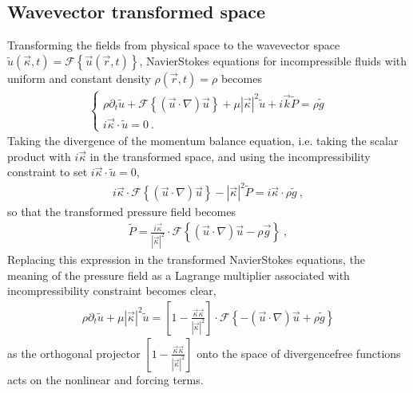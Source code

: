 \documentclass[letterpaper,10pt,english]{jupyterBook}
\begin{document}
\subsection{Wave\sphinxhyphen{}vector transformed space}
\label{\detokenize{ch/pde/ns:wave-vector-transformed-space}}
\sphinxAtStartPar
Transforming the fields from physical space to the wave\sphinxhyphen{}vector space \(\widetilde{u}(\vec{\kappa}, t) = \mathscr{F}\left\{ \vec{u}(\vec{r},t) \right\}\), Navier\sphinxhyphen{}Stokes equations for incompressible fluids with uniform and constant density \(\rho(\vec{r},t) = \rho\) becomes
\begin{equation*}
\begin{split}\begin{cases}
  \rho \partial_t \widetilde{u} + \mathscr{F}\left\{ \left( \vec{u} \cdot \nabla \right) \vec{u} \right\} + \mu |\vec{\kappa}|^2 \widetilde{u} + i \vec{k} \widetilde{P} = \rho \widetilde{g} \\
  i \vec{\kappa} \cdot \widetilde{u} = 0 \ .
\end{cases}\end{split}
\end{equation*}
\sphinxAtStartPar
Taking the divergence of the momentum balance equation, i.e. taking the scalar product with \(i \vec{\kappa}\) in the transformed space, and using the incompressibility constraint to set \(i \vec{\kappa} \cdot \widetilde{u} = 0\),
\begin{equation*}
\begin{split}i \vec{\kappa} \cdot \mathscr{F}\left\{ (\vec{u} \cdot \nabla ) \vec{u} \right\} - |\vec{\kappa}|^2 \widetilde{P} = i \vec{\kappa} \cdot \rho \widetilde{g} \ ,\end{split}
\end{equation*}
\sphinxAtStartPar
so that the transformed pressure field becomes
\begin{equation*}
\begin{split}\widetilde{P} = \frac{i \vec{\kappa}}{|\vec{\kappa}|^2} \cdot \mathscr{F} \left\{ \left( \vec{u} \cdot \nabla \right) \vec{u} - \rho \vec{g} \right\} \ ,\end{split}
\end{equation*}
\sphinxAtStartPar
Replacing this expression in the transformed Navier\sphinxhyphen{}Stokes equations, the meaning of the pressure field as a Lagrange multiplier associated with incompressibility constraint becomes clear,
\begin{equation*}
\begin{split}\rho \partial_t \widetilde{u} + \mu |\vec{\kappa}|^2 \widetilde{u} = \left[ 1 - \frac{\vec{\kappa} \vec{\kappa}}{|\vec{\kappa}|^2} \right] \cdot \mathscr{F}\left\{ - (\vec{u} \cdot \nabla) \vec{u} + \rho \widetilde{g} \right\}\end{split}
\end{equation*}
\sphinxAtStartPar
as the orthogonal projector \([ 1 - \frac{\vec{\kappa} \vec{\kappa}}{|\vec{\kappa}|^2}]\) onto the space of divergence\sphinxhyphen{}free functions acts on the non\sphinxhyphen{}linear and forcing terms.
\end{document}
